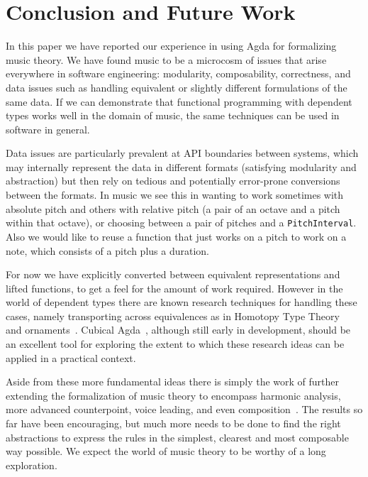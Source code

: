 \section{Conclusion and Future Work}
\label{sec:conclusion}


In this paper we have reported our experience in using Agda for
formalizing music theory.
We have found music to be a microcosm of issues that arise
everywhere in software engineering: modularity, composability,
correctness, and data issues such as handling equivalent or slightly
different formulations of the same data. If we can
demonstrate that functional programming with dependent types works
well in the domain of music, the same techniques can be used in
software in general.

Data issues are particularly prevalent at API boundaries between
systems, which may internally represent the data in different formats
(satisfying modularity and abstraction) but then rely on tedious and
potentially error-prone conversions between the formats. In music
we see this in wanting to work sometimes with absolute pitch and others
with relative pitch (a pair of an octave and a pitch within that
octave), or choosing between
a pair of pitches and a \texttt{PitchInterval}. Also we would like to
reuse a function that just works on a pitch to work on a note, which
consists of a pitch plus a duration.

For now we have explicitly converted between equivalent representations
and lifted functions, to get a feel for the amount of work
required.  However in the world of dependent types there are known
research techniques for handling these cases, namely transporting
across equivalences as in Homotopy Type Theory~\citep{hottbook} and
ornaments~\citep{dagand-ornaments}. Cubical
Agda~\citep{vezzosi-cubical}, although still early in development,
should be an excellent tool for exploring the extent to which these
research ideas can be applied in a practical context.

Aside from these more fundamental ideas there is simply the work of
further extending the formalization of music theory to encompass
harmonic analysis, more advanced counterpoint, voice leading, and even
composition~\citep{schoenberg-fundamentals}. The results so far have
been encouraging, but much more needs to be done to find the right
abstractions to express the rules in the simplest, clearest and most
composable way possible.
We expect the world of music theory to be worthy of a long exploration.

